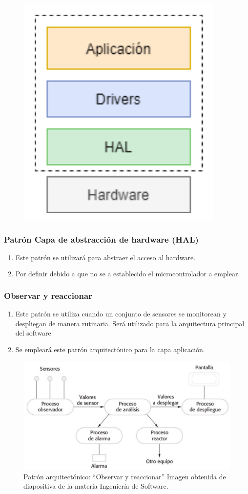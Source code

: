 \documentclass[
11pt, %
codirector, %
]{charter}
\begin{document}
\begin{figure} [bph!]
	\centering
	\includegraphics[width=0.2\linewidth]{Figuras/PatronCapas}
	\caption{}
	\label{fig:patroncapas}
\end{figure}


\subsubsection{Patrón Capa de abstracción de hardware (HAL)}
\begin{enumerate}
	\item Este patrón se utilizará para abstraer el acceso al hardware.
	\item Por definir debido a que no se a establecido el microcontrolador a emplear.
\end{enumerate}

\subsubsection{Observar y reaccionar}
\begin{enumerate}
	\item Este patrón se utiliza cuando un conjunto de sensores se monitorean y despliegan de manera rutinaria. Será utilizado para la arquitectura principal del software
	\item Se empleará este patrón arquitectónico para la capa aplicación.
\end{enumerate}

\begin{figure}[bph!]
	\centering
	\includegraphics[width=0.7\linewidth]{Figuras/PatronObservarReaccionar}
	\caption{Patrón arquitectónico: “Observar y reaccionar” Imagen obtenida de diapositiva de la materia Ingeniería de Software.}
	\label{fig:patronobservarreaccionar}
\end{figure}
\end{document}
